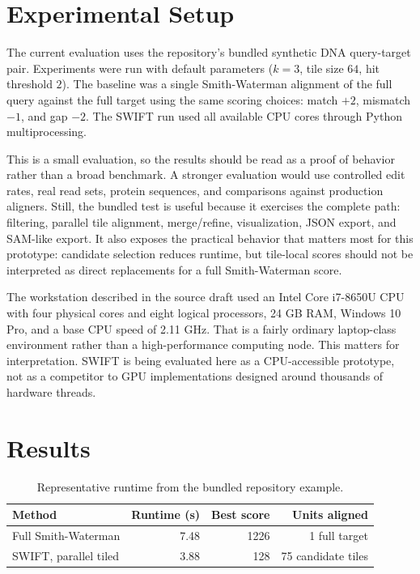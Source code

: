 \documentclass[11pt]{article}
\begin{document}
\section{Experimental Setup}
The current evaluation uses the repository's bundled synthetic DNA query-target pair. Experiments were run with default parameters ($k=3$, tile size $64$, hit threshold $2$). The baseline was a single Smith-Waterman alignment of the full query against the full target using the same scoring choices: match $+2$, mismatch $-1$, and gap $-2$. The SWIFT run used all available CPU cores through Python multiprocessing.

This is a small evaluation, so the results should be read as a proof of behavior rather than a broad benchmark. A stronger evaluation would use controlled edit rates, real read sets, protein sequences, and comparisons against production aligners. Still, the bundled test is useful because it exercises the complete path: filtering, parallel tile alignment, merge/refine, visualization, JSON export, and SAM-like export. It also exposes the practical behavior that matters most for this prototype: candidate selection reduces runtime, but tile-local scores should not be interpreted as direct replacements for a full Smith-Waterman score.

The workstation described in the source draft used an Intel Core i7-8650U CPU with four physical cores and eight logical processors, 24 GB RAM, Windows 10 Pro, and a base CPU speed of 2.11 GHz. That is a fairly ordinary laptop-class environment rather than a high-performance computing node. This matters for interpretation. SWIFT is being evaluated here as a CPU-accessible prototype, not as a competitor to GPU implementations designed around thousands of hardware threads.

\section{Results}
\begin{table}[ht]
\centering
\caption{Representative runtime from the bundled repository example.}
\label{tab:runtime}
\begin{tabular}{lrrr}
\toprule
Method & Runtime (s) & Best score & Units aligned \\
\midrule
Full Smith-Waterman & 7.48 & 1226 & 1 full target \\
SWIFT, parallel tiled & 3.88 & 128 & 75 candidate tiles \\
\bottomrule
\end{tabular}
\end{table}
\end{document}
